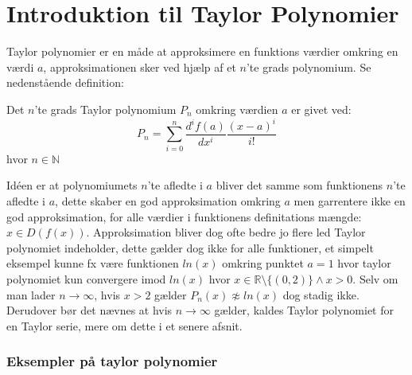 \chapter{Introduktion til Taylor Polynomier}
\label{ch:ItTP}
Taylor polynomier er en måde at approksimere en funktions værdier omkring en værdi $a$, 
approksimationen sker ved hjælp af et $n$'te grads polynomium. Se nedenstående definition: 
\begin{defn}
    Det $n$'te grads Taylor polynomium $P_n$ omkring værdien $a$ er givet ved:
    \[
    P_n = \sum^{n}_{i=0} \frac{d^i f(a)}{dx^i} \frac{(x-a)^{i}}{i!}
    \]
    hvor $n \in \mathbb{N}$
\end{defn}
\label{def:taylorPolynomium}
Idéen er at polynomiumets $n$'te afledte i $a$ bliver det samme som funktionens $n$'te afledte i $a$, 
dette skaber en god approksimation omkring $a$ men garrentere ikke en god approksimation, 
for alle værdier i funktionens definitations mængde: $x \in D(f(x))$. Approksimation bliver dog ofte bedre jo flere led
Taylor polynomiet indeholder, dette gælder dog ikke for alle funktioner, et simpelt eksempel kunne fx være funktionen $ln(x)$
omkring punktet $a=1$ hvor taylor polynomiet kun convergere imod $ln(x)$ hvor $x \in \mathbb{R} \setminus\{(0, 2)\} \land x > 0$. 
Selv om man lader $n \rightarrow \infty$, hvis $x > 2$ gælder $P_n(x) \not \approx ln(x)$ dog stadig ikke.
Derudover bør det nævnes at hvis $n \rightarrow \infty$ gælder, kaldes Taylor polynomiet for en Taylor serie, mere om dette i et senere afsnit. %
\subsection*{Eksempler på taylor polynomier}

